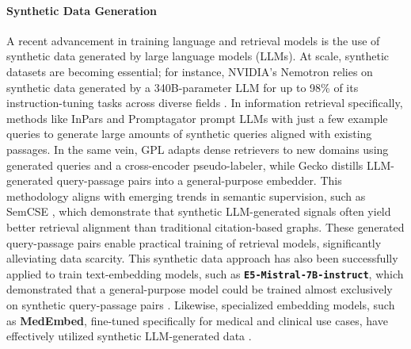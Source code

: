 \documentclass[twoside,twocolumn,9pt]{article}
\begin{document}
\paragraph*{Synthetic Data Generation}
A recent advancement in training language and retrieval models is the use of synthetic data generated by large language models (LLMs). At scale, synthetic datasets are becoming essential; for instance, NVIDIA's Nemotron relies on synthetic data generated by a 340B-parameter LLM for up to 98\% of its instruction-tuning tasks across diverse fields \cite{adler2024nemotron}. In information retrieval specifically, methods like InPars \cite{jeronymo2023inpars, bonifacio2022inpars} and Promptagator \cite{dai2022promptagator} prompt LLMs with just a few example queries to generate large amounts of synthetic queries aligned with existing passages. In the same vein, GPL \cite{wang2022gpl} adapts dense retrievers to new domains using generated queries and a cross-encoder pseudo-labeler, while Gecko \cite{lee2024gecko} distills LLM-generated query-passage pairs into a general-purpose embedder. This methodology aligns with emerging trends in semantic supervision, such as SemCSE \cite{brinner2025semcse}, which demonstrate that synthetic LLM-generated signals often yield better retrieval alignment than traditional citation-based graphs. These generated query-passage pairs enable practical training of retrieval models, significantly alleviating data scarcity. This synthetic data approach has also been successfully applied to train text-embedding models, such as \textbf{\texttt{E5-Mistral-7B-instruct}}, which demonstrated that a general-purpose model could be trained almost exclusively on synthetic query-passage pairs \cite{wang2023improving}. Likewise, specialized embedding models, such as \textbf{MedEmbed}, fine-tuned specifically for medical and clinical use cases, have effectively utilized synthetic LLM-generated data \cite{balachandran2024medembed}.
\end{document}
